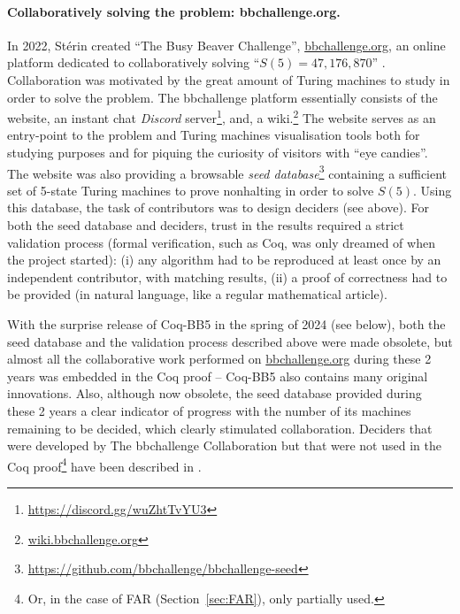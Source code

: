 \documentclass[a4paper,british]{article}
\theoremstyle{definition} %
\numberwithin{equation}{section}
\theoremstyle{definition} %
\newcommand{\BBtheFifth}{47{,}176{,}870}
\newcommand{\CoqBB}{Coq-BB5\xspace}
\begin{document}
\paragraph{Collaboratively solving the problem: bbchallenge.org.} In 2022, Stérin created ``The Busy Beaver Challenge'', \url{bbchallenge.org}, an online platform dedicated to collaboratively solving ``$S(5)=\BBtheFifth$'' \cite{sterin_2022_14955828}. Collaboration was motivated by the great amount of Turing machines to study in order to solve the problem. The bbchallenge platform essentially consists of the website, an instant chat \textit{Discord} server\footnote{\url{https://discord.gg/wuZhtTvYU3}}, and, a wiki.\footnote{\url{wiki.bbchallenge.org}} The website serves as an entry-point to the problem and Turing machines visualisation tools both for studying purposes and for piquing the curiosity of visitors with ``eye candies''. The website was also providing a browsable \textit{seed database}\footnote{\url{https://github.com/bbchallenge/bbchallenge-seed}} containing a sufficient set of 5-state Turing machines to prove nonhalting in order to solve $S(5)$. Using this database, the task of contributors was to design deciders (see above). For both the seed database and deciders, trust in the results required a strict validation process (formal verification, such as Coq, was only dreamed of when the project started): (i) any algorithm had to be reproduced at least once by an independent contributor, with matching results, (ii) a proof of correctness had to be provided (in natural language, like a regular mathematical article).


With the surprise release of \CoqBB in the spring of 2024 (see below), both the seed database and the validation process described above were made obsolete, but almost all the collaborative work performed on \url{bbchallenge.org} during these 2 years was embedded in the Coq proof -- \CoqBB also contains many original innovations. Also, although now obsolete, the seed database provided during these 2 years a clear indicator of progress with the number of its machines remaining to be decided, which clearly stimulated collaboration. Deciders that were developed by The bbchallenge Collaboration but that were not used in the Coq proof\footnote{Or, in the case of FAR (Section~\ref{sec:FAR}), only partially used.} have been described in \cite{bbchallenge_part1}.
\end{document}
